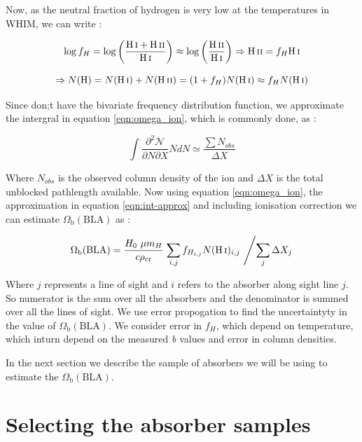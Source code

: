 Now, as the neutral fraction of hydrogen is very low at the temperatures in WHIM, we can write :

\begin{equation*}
     \log f_H = \log \left(\frac{\ion{H}{i}+\ion{H}{ii}}{\ion{H}{i}}\right) \approx \log \left(\frac{\ion{H}{ii}}{\ion{H}{i}}\right)  \Rightarrow  \ion{H}{ii}= f_H \ion{H}{i}
\end{equation*}

\begin{equation*}
     \Rightarrow  N(\text{H}) = N(\ion{H}{i})+N(\ion{H}{ii}) = (1+f_H)N(\ion{H}{i}) \approx f_H N(\ion{H}{i})
\end{equation*}

Since don;t have the bivariate frequency distribution function, we approximate the intergral in equation \ref{eqn:omega_ion}, which is commonly done, as : 

\begin{equation} \label{eqn:int-approx}
    \int \frac{\partial ^2 \mathcal{N}}{\partial N  \partial X} N dN \simeq \frac{\sum N_{obs}}{\Delta X} 
\end{equation}

Where $N_{obs}$ is the observed column density of the ion and $\Delta X$ is the total unblocked pathlength available. Now using equation \ref{eqn:omega_ion}, the approximation in equation \ref{eqn:int-approx} and including ionisation correction we can estimate $\Omega_\text{b}(\text{BLA})$ as :

\begin{equation}
    \Omega_\text{b}(\text{BLA}) = \frac{H_0 \ \mu m_H}{c \rho_{\text{cr}}} \left. \sum_{i,j} f_{H_{i,j}} N(\ion{H}{i})_{i,j} \ \middle / \sum_j \Delta X_j \right.
\end{equation}

Where $j$ represents a line of sight and $i$ refers to the absorber along sight line $j$. So numerator is the sum over all the absorbers and the denominator is summed over all the lines of sight.  We use error propogation to find the uncertaintyty in the value of $\Omega_\text{b}(\text{BLA})$. We consider error in $f_H$, which depend on temperature, which inturn depend on the measured \emph{b} values and error in  column densities.  

In the next section we describe the sample of absorbers we will be using to estimate the $\Omega_\text{b}(\text{BLA})$.

\section{Selecting the absorber samples}  \label{sec:BLA-sample}

